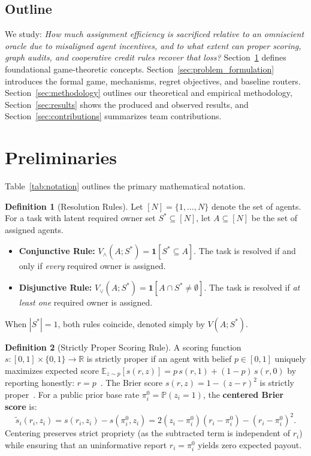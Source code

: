 \documentclass{article}
\theoremstyle{definition}
\newtheorem{definition}{Definition}
\begin{document}
\subsection{Outline}
We study: \emph{How much assignment efficiency is sacrificed relative to an omniscient oracle due to misaligned agent incentives, and to what extent can proper scoring, graph audits, and cooperative credit rules recover that loss?} 
Section~\ref{sec:preliminaries} defines foundational game-theoretic concepts. Section~\ref{sec:problem_formulation} introduces the formal game, mechanisms, regret objectives, and baseline routers. Section~\ref{sec:methodology} outlines our theoretical and empirical methodology, Section~\ref{sec:results} shows the produced and observed results, and Section~\ref{sec:contributions} summarizes team contributions.

\section{Preliminaries}
\label{sec:preliminaries}

Table~\ref{tab:notation} outlines the primary mathematical notation.

\begin{definition}[Resolution Rules]
Let $[N] = \{1, \dots, N\}$ denote the set of agents. For a task with latent required owner set $S^* \subseteq [N]$, let $A \subseteq [N]$ be the set of assigned agents.
\begin{itemize}
    \item \textbf{Conjunctive Rule:} $V_\wedge(A; S^*) = \mathbf{1}[S^* \subseteq A]$. The task is resolved if and only if \emph{every} required owner is assigned.
    \item \textbf{Disjunctive Rule:} $V_\vee(A; S^*) = \mathbf{1}[A \cap S^* \neq \emptyset]$. The task is resolved if \emph{at least one} required owner is assigned.
\end{itemize}
When $|S^*| = 1$, both rules coincide, denoted simply by $V(A; S^*)$.
\end{definition}

\begin{definition}[Strictly Proper Scoring Rule]
A scoring function $s: [0, 1] \times \{0, 1\} \to \mathbb{R}$ is strictly proper if an agent with belief $p \in [0, 1]$ uniquely maximizes expected score $\mathbb{E}_{z \sim p}[s(r, z)] = p\, s(r, 1) + (1-p)\, s(r, 0)$ by reporting honestly: $r = p$~\cite{gneiting2007strictly}. The Brier score $s(r, z) = 1 - (z - r)^2$ is strictly proper~\cite{brier1950verification}. For a public prior base rate $\pi_i^0 = \mathbb{P}(z_i = 1)$, the \textbf{centered Brier score} is:
\begin{equation}
    \tilde{s}_i(r_i, z_i) = s(r_i, z_i) - s(\pi_i^0, z_i) = 2(z_i - \pi_i^0)(r_i - \pi_i^0) - (r_i - \pi_i^0)^2.
\end{equation}
Centering preserves strict propriety (as the subtracted term is independent of $r_i$) while ensuring that an uninformative report $r_i = \pi_i^0$ yields zero expected payout.
\end{definition}
\end{document}

